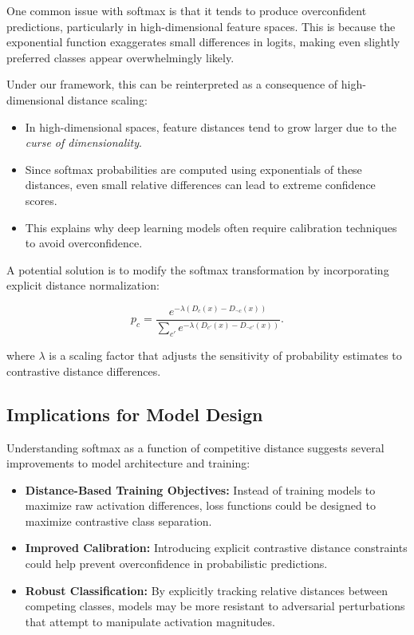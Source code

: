 One common issue with softmax is that it tends to produce overconfident predictions, particularly in high-dimensional feature spaces. This is because the exponential function exaggerates small differences in logits, making even slightly preferred classes appear overwhelmingly likely.

Under our framework, this can be reinterpreted as a consequence of high-dimensional distance scaling:

\begin{itemize}
    \item In high-dimensional spaces, feature distances tend to grow larger due to the \textit{curse of dimensionality}.
    \item Since softmax probabilities are computed using exponentials of these distances, even small relative differences can lead to extreme confidence scores.
    \item This explains why deep learning models often require calibration techniques to avoid overconfidence.
\end{itemize}

A potential solution is to modify the softmax transformation by incorporating explicit distance normalization:

\[
p_c = \frac{e^{-\lambda (D_c(x) - D_{\neg c}(x))}}{\sum_{c'} e^{-\lambda (D_{c'}(x) - D_{\neg c'}(x))}}.
\]

where \( \lambda \) is a scaling factor that adjusts the sensitivity of probability estimates to contrastive distance differences.

\subsection{Implications for Model Design}

Understanding softmax as a function of competitive distance suggests several improvements to model architecture and training:

\begin{itemize}
    \item \textbf{Distance-Based Training Objectives:} Instead of training models to maximize raw activation differences, loss functions could be designed to maximize contrastive class separation.
    \item \textbf{Improved Calibration:} Introducing explicit contrastive distance constraints could help prevent overconfidence in probabilistic predictions.
    \item \textbf{Robust Classification:} By explicitly tracking relative distances between competing classes, models may be more resistant to adversarial perturbations that attempt to manipulate activation magnitudes.
\end{itemize}

